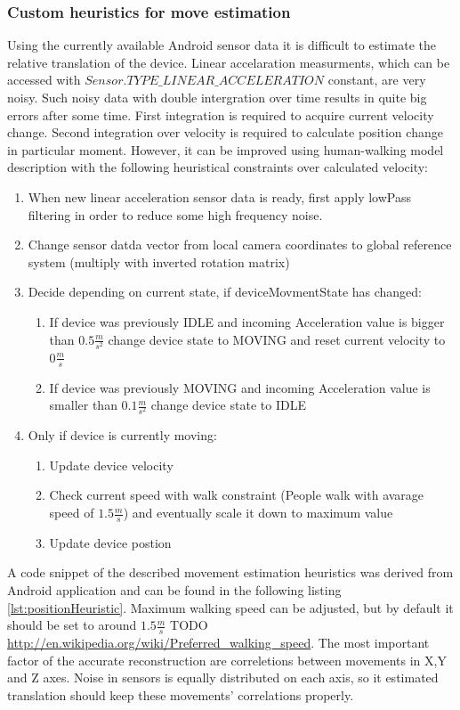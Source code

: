 \subsubsection{Custom heuristics for move estimation}
Using the currently available Android sensor data it is difficult to estimate the relative translation of the device. Linear accelaration measurments, which can be accessed with $Sensor.TYPE\_LINEAR\_ACCELERATION$ constant, are very noisy. Such noisy data with double intergration over time results in quite big errors after some time. First integration is required to acquire current velocity change. Second integration over velocity is required to calculate position change in particular moment.
However, it can be improved using human-walking model description with the following heuristical constraints over calculated velocity:
\begin{enumerate}
\item When new linear acceleration sensor data is ready, first apply lowPass filtering in order to reduce some high frequency noise.
\item Change sensor datda vector from local camera coordinates to global reference system (multiply with inverted rotation matrix)
\item Decide depending on current state, if deviceMovmentState has changed:
\begin{enumerate}
\item If device was previously IDLE and incoming Acceleration value is bigger than $0.5\frac{m}{s^2}$ change device state to MOVING and reset current velocity to $0\frac{m}{s}$
\item If device was previously MOVING and incoming Acceleration value is smaller than $0.1\frac{m}{s^2}$ change device state to IDLE
\end{enumerate}
\item Only if device is currently moving:
\begin{enumerate}
\item Update device velocity
\item Check current speed with walk constraint (People walk with avarage speed of $1.5\frac{m}{s}$) and eventually scale it down to maximum value
\item Update device postion
\end{enumerate}
\end{enumerate}
A code snippet of the described movement estimation heuristics was derived from Android application and can be found in the following listing \ref{lst:positionHeuristic}. Maximum walking speed can be adjusted, but by default it should be set to around $1.5\frac{m}{s}$ TODO \url{http://en.wikipedia.org/wiki/Preferred_walking_speed}. 
The most important factor of the accurate reconstruction are correletions between movements in X,Y and Z axes. Noise in sensors is equally distributed on each axis, so it estimated translation should keep these movements' correlations properly.

